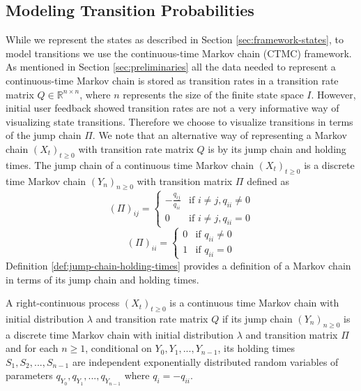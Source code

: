 \subsection{Modeling Transition Probabilities}
\label{sec:framework-transitions}

While we represent the states as described in Section \ref{sec:framework-states},
to model transitions we use the continuous-time Markov chain (CTMC) framework.
As mentioned in Section \ref{sec:preliminaries} all the data needed to represent a continuous-time Markov chain
is stored as transition rates in a transition rate matrix $Q \in \mathbb{R}^{n \times n}$, where $n$ represents
the size of the finite state space $I$. However, initial user
feedback showed transition rates are not a very informative way of visualizing state transitions. Therefore
we choose to visualize transitions in terms of the jump chain $\Pi$.
We note that an alternative way of representing a Markov chain $(X_t)_{t \ge 0}$ with transition rate matrix $Q$
is by its jump chain and holding times. The jump chain of a continuous time Markov chain $(X_t)_{t \ge 0}$ is
a discrete time Markov chain $(Y_n)_{n \ge 0}$ with transition matrix $\Pi$ defined as
\begin{equation}
	\nonumber
	\left(\Pi\right)_{ij} = 
		\left\{
			\begin{array}{ll}
				-\frac{q_{ij}}{q_{ii}} & \mbox{if } i \ne j, q_{ii} \ne 0 \\
				0 & \mbox{if } i \ne j, q_{ii} = 0
			\end{array}
		\right.
\end{equation}
\begin{equation}
	\nonumber
	\left(\Pi\right)_{ii} = 
		\left\{
			\begin{array}{ll}
				0 & \mbox{if } q_{ii} \ne 0 \\
				1 & \mbox{if } q_{ii} = 0
			\end{array}
		\right.
\end{equation}
Definition \ref{def:jump-chain-holding-times} provides a definition of a Markov chain in terms of its jump chain and holding times.

\begin{defn}
	\label{def:jump-chain-holding-times}
	A right-continuous process $(X_t)_{t \ge 0}$ is a continuous time Markov chain with initial
	distribution $\lambda$ and transition rate matrix $Q$ if its jump chain $(Y_n)_{n \ge 0}$ is a 
	discrete time Markov chain with initial distribution $\lambda$ and transition matrix $\Pi$ and
	for each $n \ge 1$, conditional on $Y_0, Y_1, ..., Y_{n-1}$, its holding times $S_1, S_2, ..., S_{n-1}$
	are independent exponentially distributed random variables of parameters $q_{Y_0}, q_{Y_1}, ..., q_{Y_{n-1}}$
	where $q_i = -q_{ii}$.
\end{defn}

